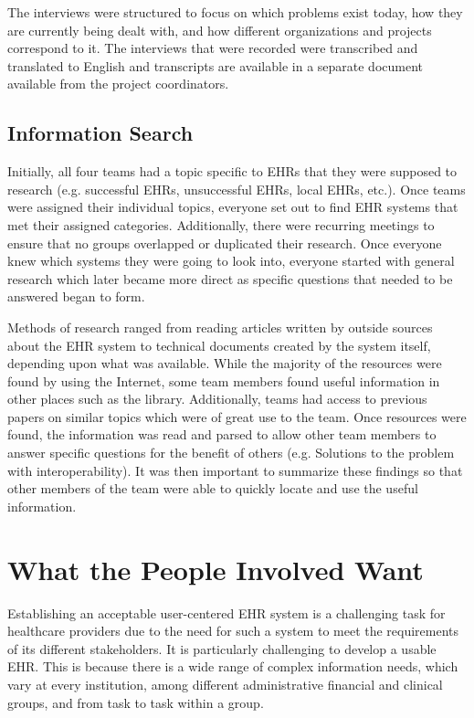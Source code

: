 \documentclass[14pt]{article}
\begin{document}
The interviews were structured to focus on which problems exist today, how they are currently being dealt with, and how different organizations and projects correspond to it. The interviews that were recorded were transcribed and translated to English and transcripts are available in a separate document available from the project coordinators.

\subsection{Information Search}
Initially, all four teams had a topic specific to \glspl{EHR} that they were supposed to research (e.g. successful \glspl{EHR}, unsuccessful \glspl{EHR}, local \glspl{EHR}, etc.). Once teams were assigned their individual topics, everyone set out to find \gls{EHR} systems that met their assigned categories. Additionally, there were recurring meetings to ensure that no groups overlapped or duplicated their research. Once everyone knew which systems they were going to look into, everyone started with general research which later became more direct as specific questions that needed to be answered began to form.

Methods of research ranged from reading articles written by outside sources about the \gls{EHR} system to technical documents created by the system itself, depending upon what was available.  While the majority of the resources were found by using the Internet, some team members found useful information in other places such as the library.  Additionally, teams had access to previous papers on similar topics which were of great use to the team.  Once resources were found, the information was read and parsed to allow other team members to answer specific questions for the benefit of others (e.g. Solutions to the problem with interoperability).  It was then important to summarize these findings so that other members of the team were able to quickly locate and use the useful information.


\newpage

\section{What the People Involved Want}
\label{sec:People}
Establishing an acceptable user-centered  \gls{EHR} system is a challenging task for healthcare providers due to the need for such a system to meet the requirements of its different stakeholders. It is particularly challenging to develop a usable  \gls{EHR}. This is because there is a wide range of complex information needs, which vary at every institution, among different administrative financial and clinical groups, and from task to task within a group.
\end{document}
